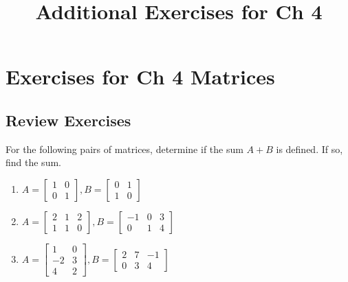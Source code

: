 \documentclass{ximera}
\title{Additional Exercises for Ch 4} \license{CC BY-NC-SA 4.0}
\begin{document}
\begin{abstract}
\end{abstract}
\maketitle

\section*{Exercises for Ch 4 Matrices}

\subsection*{Review Exercises}

\begin{problem}\label{prb:4.1} For the following pairs of matrices, determine if the sum $A + B$ is defined. If so, find the sum.
\begin{enumerate}
\item
$A = \left[ \begin{array}{rr}
1 & 0 \\
0 & 1
\end{array} \right],
B = \left[ \begin{array}{rr}
0 & 1 \\
1 & 0
\end{array} \right]$

\item
$A = \left[ \begin{array}{rrr}
2 & 1 & 2 \\
1 & 1 & 0
\end{array} \right],  B = \left[ \begin{array}{rrr}
-1 & 0 & 3\\
0 & 1 & 4
\end{array} \right]$

\item
$A = \left[ \begin{array}{rr}
1 & 0 \\
-2 & 3 \\
4 & 2
\end{array} \right], B = \left[ \begin{array}{rrr}
2 & 7 & -1 \\
0 & 3 & 4
\end{array} \right]$
\end{enumerate}
\end{problem}
\end{document}
